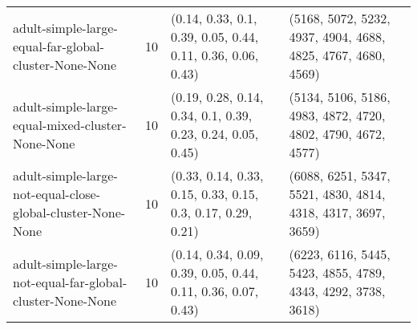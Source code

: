 \begin{longtable}{llll}
                                                        adult-simple-large-equal-far-global-cluster-None-None &             10 &                                                                                                                                                                                                                                               (0.14, 0.33, 0.1, 0.39, 0.05, 0.44, 0.11, 0.36, 0.06, 0.43) &                                                                                                                                                                                                                                              (5168, 5072, 5232, 4937, 4904, 4688, 4825, 4767, 4680, 4569) \\
                                                             adult-simple-large-equal-mixed-cluster-None-None &             10 &                                                                                                                                                                                                                                               (0.19, 0.28, 0.14, 0.34, 0.1, 0.39, 0.23, 0.24, 0.05, 0.45) &                                                                                                                                                                                                                                              (5134, 5106, 5186, 4983, 4872, 4720, 4802, 4790, 4672, 4577) \\
                                                  adult-simple-large-not-equal-close-global-cluster-None-None &             10 &                                                                                                                                                                                                                                               (0.33, 0.14, 0.33, 0.15, 0.33, 0.15, 0.3, 0.17, 0.29, 0.21) &                                                                                                                                                                                                                                              (6088, 6251, 5347, 5521, 4830, 4814, 4318, 4317, 3697, 3659) \\
                                                    adult-simple-large-not-equal-far-global-cluster-None-None &             10 &                                                                                                                                                                                                                                              (0.14, 0.34, 0.09, 0.39, 0.05, 0.44, 0.11, 0.36, 0.07, 0.43) &                                                                                                                                                                                                                                              (6223, 6116, 5445, 5423, 4855, 4789, 4343, 4292, 3738, 3618) \\

\end{longtable}
